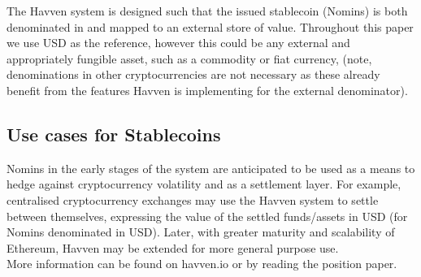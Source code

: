 \noindent The Havven system is designed such that the issued stablecoin (Nomins) is both denominated in and mapped to an external store of value. Throughout this paper we use USD as the reference, however this could be any external and appropriately fungible asset, such as a commodity or fiat currency, (note, denominations in other cryptocurrencies are not necessary as these already benefit from the features Havven is implementing for the external denominator). \\

\subsection{Use cases for Stablecoins}

\noindent Nomins in the early stages of the system are anticipated to be used as a means to hedge against cryptocurrency volatility and as a settlement layer. For example, centralised cryptocurrency exchanges may use the Havven system to settle between themselves, expressing the value of the settled funds/assets in USD (for Nomins denominated in USD). Later, with greater maturity and scalability of Ethereum, Havven may be extended for more general purpose use. \\


\noindent More information can be found on havven.io or by reading the position paper.

\pagebreak
